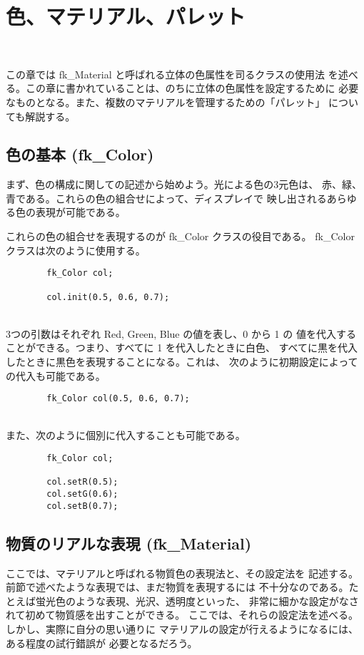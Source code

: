 \chapter{色、マテリアル、パレット} \label{chap:material} ~

この章では fk\_Material と呼ばれる立体の色属性を司るクラスの使用法
を述べる。この章に書かれていることは、のちに立体の色属性を設定するために
必要なものとなる。また、複数のマテリアルを管理するための「パレット」
についても解説する。
\section{色の基本 (fk\_Color)}
まず、色の構成に関しての記述から始めよう。光による色の3元色は、
赤、緑、青である。これらの色の組合せによって、ディスプレイで
映し出されるあらゆる色の表現が可能である。

これらの色の組合せを表現するのが fk\_Color クラスの役目である。
fk\_Color クラスは次のように使用する。
\\
\begin{screen}
\begin{verbatim}
        fk_Color col;

        col.init(0.5, 0.6, 0.7);
\end{verbatim}
\end{screen}
~ \\
3つの引数はそれぞれ Red, Green, Blue の値を表し、0 から 1 の
値を代入することができる。つまり、すべてに 1 を代入したときに白色、
すべてに黒を代入したときに黒色を表現することになる。これは、
次のように初期設定によっての代入も可能である。
\\
\begin{screen}
\begin{verbatim}
        fk_Color col(0.5, 0.6, 0.7);
\end{verbatim}
\end{screen}
~ \\
また、次のように個別に代入することも可能である。
\\
\begin{screen}
\begin{verbatim}
        fk_Color col;

        col.setR(0.5);
        col.setG(0.6);
        col.setB(0.7);
\end{verbatim}
\end{screen}
\section{物質のリアルな表現 (fk\_Material)}
ここでは、マテリアルと呼ばれる物質色の表現法と、その設定法を
記述する。前節で述べたような表現では、まだ物質を表現するには
不十分なのである。たとえば蛍光色のような表現、光沢、透明度といった、
非常に細かな設定がなされて初めて物質感を出すことができる。
ここでは、それらの設定法を述べる。しかし、実際に自分の思い通りに
マテリアルの設定が行えるようになるには、ある程度の試行錯誤が
必要となるだろう。

